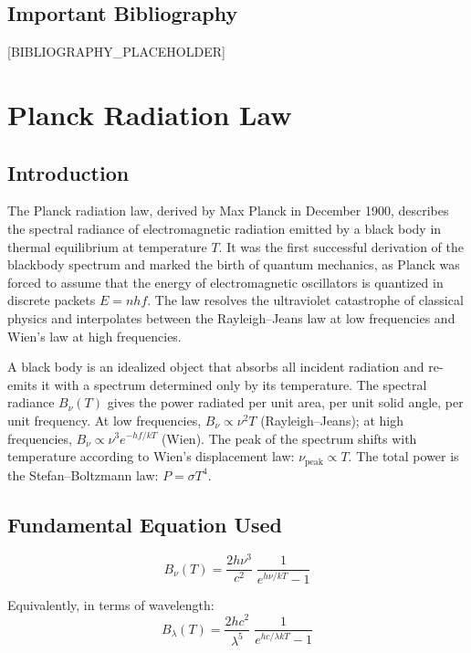 \documentclass[11pt,openright]{book}
\begin{document}
\section*{Important Bibliography}

[BIBLIOGRAPHY_PLACEHOLDER]


\chapter{Planck Radiation Law}

\section*{Introduction}

The Planck radiation law, derived by Max Planck in December 1900, describes the spectral radiance of electromagnetic radiation emitted by a black body in thermal equilibrium at temperature $T$. It was the first successful derivation of the blackbody spectrum and marked the birth of quantum mechanics, as Planck was forced to assume that the energy of electromagnetic oscillators is quantized in discrete packets $E = nhf$. The law resolves the ultraviolet catastrophe of classical physics and interpolates between the Rayleigh--Jeans law at low frequencies and Wien's law at high frequencies.

A black body is an idealized object that absorbs all incident radiation and re-emits it with a spectrum determined only by its temperature. The spectral radiance $B_{\nu}(T)$ gives the power radiated per unit area, per unit solid angle, per unit frequency. At low frequencies, $B_{\nu} \propto \nu^{2}T$ (Rayleigh--Jeans); at high frequencies, $B_{\nu} \propto \nu^{3}e^{-hf/kT}$ (Wien). The peak of the spectrum shifts with temperature according to Wien's displacement law: $\nu_{\text{peak}} \propto T$. The total power is the Stefan--Boltzmann law: $P = \sigma T^{4}$.
\section*{Fundamental Equation Used}

\begin{equation}
\boxed{\; B_{\nu}(T) = \frac{2h\nu^{3}}{c^{2}}\;\frac{1}{e^{h\nu/kT} - 1}\;}
\label{eq:planck-radiation}
\end{equation}

Equivalently, in terms of wavelength:
\begin{equation}
B_{\lambda}(T) = \frac{2hc^{2}}{\lambda^{5}}\;\frac{1}{e^{hc/\lambda kT} - 1}
\label{eq:planck-wavelength}
\end{equation}
\end{document}
